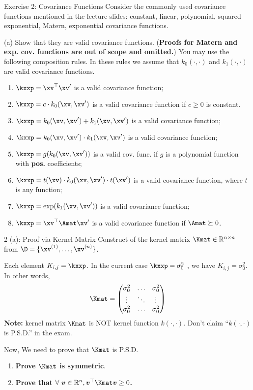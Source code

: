 \documentclass[aspectratio=169]{beamer}
\newcommand{\xvp}{\xv^\prime}
\newcommand{\kz}{k_0}
\newcommand{\ko}{k_1}
\newcommand{\kzxxp}{\kz(\xv, \xvp)}
\newcommand{\koxxp}{\ko(\xv, \xvp)}
\newcommand{\Kij}{K_{i,j}}
\newcommand{\vv}{\bm{v}}
\begin{document}
\begin{frame}{Exercise 2: Covariance Functions}
	\small
	Consider the commonly used covariance functions mentioned in the lecture slides: constant, linear, polynomial, squared exponential, Matern, exponential covariance functions.
	\vspace{1em}

	(a) Show that they are valid covariance functions. (\textbf{Proofs for Matern and exp. cov. functions are out of scope and omitted.}) You may use the following composition rules. In these rules we assume that $k_0(\cdot, \cdot)$ and $k_1(\cdot, \cdot)$ are valid covariance functions.
	\begin{enumerate}
		\item $\kxxp = \xv^\top \xvp$ is a valid covariance function;
		\item $\kxxp = c \cdot \kzxxp$ is a valid covariance function if $c \geq 0$ is constant.
		\item $\kxxp = \kzxxp + \koxxp$ is a valid covariance function;
		\item $\kxxp = \kzxxp \cdot \koxxp$ is a valid covariance function;
		\item $\kxxp = g(\kzxxp)$ is a valid cov. func. if $g$ is a polynomial function with \textbf{pos.} coefficients;
		\item $\kxxp = t(\xv) \cdot \kzxxp \cdot t(\xvp)$ is a valid covariance function, where $t$ is any function;
		\item $\kxxp = \exp(\koxxp)$ is a valid covariance function;
		\item $\kxxp = \xv^\top \Amat \xvp$ is a valid covariance function if $\Amat \succeq 0$.
	\end{enumerate}
\end{frame}

\begin{frame}{2 (a): Proof via Kernel Matrix}
	\small
	Construct of the kernel matrix $\Kmat \in \mathbb{R}^{n \times n}$ from $\D = \{\xv^{(1)}, \ldots, \xv^{(n)} \}$.
	
	Each element $\Kij = \kxxp$. In the current case $\kxxp = \sigma_0^2$ , we have $\Kij = \sigma_0^2$. In other words, 
	\begin{equation*}
		\Kmat = \begin{pmatrix}
			\sigma_0^2 & \ldots & \sigma_0^2 \\
			\vdots & \ddots & \vdots \\
			\sigma_0^2 & \ldots & \sigma_0^2 \\
		\end{pmatrix}
	\end{equation*}
	\textbf{Note:} kernel matrix $\Kmat$ is NOT kernel function $k(\cdot, \cdot)$. Don't claim ``$k(\cdot, \cdot)$ is P.S.D.'' in the exam. 
	 
	 Now, We need to prove that $\Kmat$ is P.S.D.
	\begin{enumerate}
		\item \textbf{Prove $\Kmat$ is symmetric}. 
		\item \textbf{Prove that $\forall \ \vv \in \mathbb{R}^n, \vv^\top \Kmat \vv \geq 0$.}
	\end{enumerate}
\end{frame}
\end{document}
